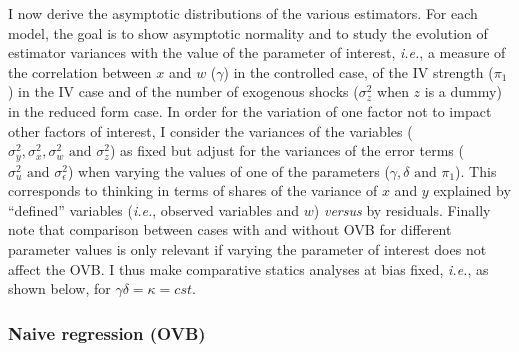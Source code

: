 \documentclass[usletter, 12pt]{article}
\begin{document}
			I now derive the asymptotic distributions of the various estimators. For each model, the goal is to show asymptotic normality and to study the evolution of estimator variances with the value of the parameter of interest, \textit{i.e.}, a measure of the correlation between $x$ and $w$ ($\gamma$) in the controlled case, of the IV strength ($\pi_{1}$) in the IV case and of the number of exogenous shocks ($\sigma_{z}^{2}$ when $z$ is a dummy) in the reduced form case.  %
			In order for the variation of one factor not to impact other factors of interest, I consider the variances of the variables ($\sigma_{y}^{2}, \sigma_{x}^{2}, \sigma_{w}^{2} \text{ and } \sigma_{z}^{2}$) as fixed but adjust for the variances of the error terms ($\sigma_{u}^{2} \text{ and } \sigma_{\epsilon}^{2}$) when varying the values of one of the parameters ($\gamma, \delta \text{ and } \pi_{1}$). This corresponds to thinking in terms of shares of the variance of $x$ and $y$ explained by ``defined'' variables (\textit{i.e.}, observed variables and $w$) \textit{versus} by residuals. Finally note that comparison between cases with and without OVB for different parameter values is only relevant if varying the parameter of interest does not affect the OVB. I thus make comparative statics analyses at bias fixed, \textit{i.e.}, as shown below, for $\gamma \delta = \kappa = cst$.
			

			\subsubsection{Naive regression (OVB)}\label{formal_proof_ovb}
			
\end{document}
